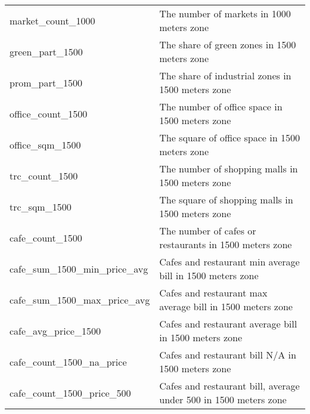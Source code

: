 \begin{longtable}[c]{ll}
    market\_count\_1000                        & The number of markets in 1000 meters zone                                                                                 \\
    green\_part\_1500                          & The share of green zones in 1500 meters zone                                                                              \\
    prom\_part\_1500                           & The share of industrial zones in 1500 meters zone                                                                         \\
    office\_count\_1500                        & The number of office space in 1500 meters zone                                                                            \\
    office\_sqm\_1500                          & The square of office space in 1500 meters zone                                                                            \\
    trc\_count\_1500                           & The number of shopping malls in 1500 meters zone                                                                          \\
    trc\_sqm\_1500                             & The square of shopping malls in 1500 meters zone                                                                          \\
    cafe\_count\_1500                          & The number of cafes or restaurants in 1500 meters zone                                                                    \\
    cafe\_sum\_1500\_min\_price\_avg           & Cafes and restaurant min average bill in 1500 meters zone                                                                 \\
    cafe\_sum\_1500\_max\_price\_avg           & Cafes and restaurant max average bill in 1500 meters zone                                                                 \\
    cafe\_avg\_price\_1500                     & Cafes and restaurant average bill in 1500 meters zone                                                                     \\
    cafe\_count\_1500\_na\_price               & Cafes and restaurant bill N/A in 1500 meters zone                                                                         \\
    cafe\_count\_1500\_price\_500              & Cafes and restaurant bill, average under 500 in 1500 meters zone                                                          \\

\end{longtable}
